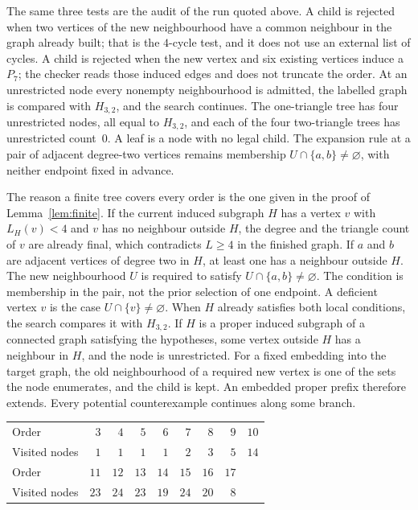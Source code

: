 \documentclass[ASNA]{USG}
\theoremstyle{WBstyletwo}
\numberwithin{equation}{section}
\begin{document}
The same three tests are the audit of the run quoted above. A child is rejected when two vertices of the new neighbourhood have a common neighbour in the graph already built; that is the $4$-cycle test, and it does not use an external list of cycles. A child is rejected when the new vertex and six existing vertices induce a $P_7$; the checker reads those induced edges and does not truncate the order. At an unrestricted node every nonempty neighbourhood is admitted, the labelled graph is compared with $H_{3,2}$, and the search continues. The one-triangle tree has four unrestricted nodes, all equal to $H_{3,2}$, and each of the four two-triangle trees has unrestricted count~$0$. A leaf is a node with no legal child. The expansion rule at a pair of adjacent degree-two vertices remains membership $U\cap\{a,b\}\neq\varnothing$, with neither endpoint fixed in advance.

The reason a finite tree covers every order is the one given in the proof of Lemma~\ref{lem:finite}. If the current induced subgraph $H$ has a vertex $v$ with $L_H(v)<4$ and $v$ has no neighbour outside $H$, the degree and the triangle count of $v$ are already final, which contradicts $L\ge 4$ in the finished graph. If $a$ and $b$ are adjacent vertices of degree two in $H$, at least one has a neighbour outside $H$. The new neighbourhood $U$ is required to satisfy $U\cap\{a,b\}\neq\varnothing$. The condition is membership in the pair, not the prior selection of one endpoint. A deficient vertex $v$ is the case $U\cap\{v\}\neq\varnothing$. When $H$ already satisfies both local conditions, the search compares it with $H_{3,2}$. If $H$ is a proper induced subgraph of a connected graph satisfying the hypotheses, some vertex outside $H$ has a neighbour in $H$, and the node is unrestricted. For a fixed embedding into the target graph, the old neighbourhood of a required new vertex is one of the sets the node enumerates, and the child is kept. An embedded proper prefix therefore extends. Every potential counterexample continues along some branch.

\begin{center}
\begin{tabular}{@{}lrrrrrrrr@{}}
\toprule
Order & $3$ & $4$ & $5$ & $6$ & $7$ & $8$ & $9$ & $10$\\
Visited nodes & $1$ & $1$ & $1$ & $1$ & $2$ & $3$ & $5$ & $14$\\
\midrule
Order & $11$ & $12$ & $13$ & $14$ & $15$ & $16$ & $17$\\
Visited nodes & $23$ & $24$ & $23$ & $19$ & $24$ & $20$ & $8$\\
\bottomrule
\end{tabular}
\end{center}
\end{document}
